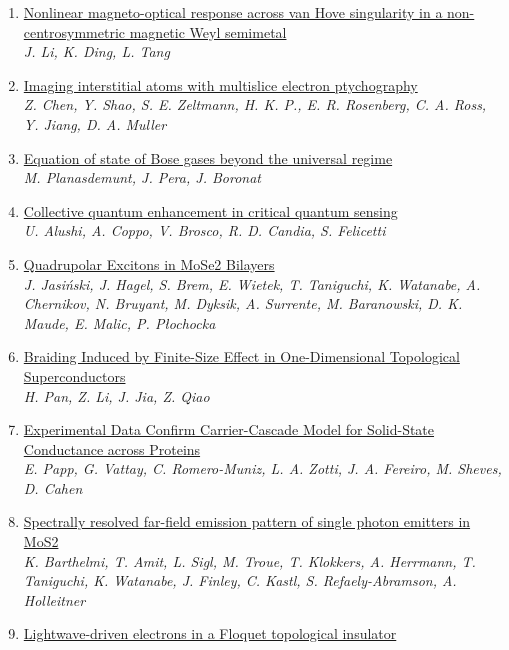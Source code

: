 \documentclass{article}
\begin{document}
\begin{enumerate}
\item\href{http://arxiv.org/abs/2407.18094v1}{\textsf{Nonlinear magneto-optical response across van Hove singularity in a
  non-centrosymmetric magnetic Weyl semimetal}}\\
{\small\color{blue}\textsl{J. Li, K. Ding, L. Tang}}
\item\href{http://arxiv.org/abs/2407.18063v1}{\textsf{Imaging interstitial atoms with multislice electron ptychography}}\\
{\small\color{blue}\textsl{Z. Chen, Y. Shao, S. E. Zeltmann, H. K. P., E. R. Rosenberg, C. A. Ross, Y. Jiang, D. A. Muller}}
\item\href{http://arxiv.org/abs/2407.18059v1}{\textsf{Equation of state of Bose gases beyond the universal regime}}\\
{\small\color{blue}\textsl{M. Planasdemunt, J. Pera, J. Boronat}}
\item\href{http://arxiv.org/abs/2407.18055v1}{\textsf{Collective quantum enhancement in critical quantum sensing}}\\
{\small\color{blue}\textsl{U. Alushi, A. Coppo, V. Brosco, R. D. Candia, S. Felicetti}}
\item\href{http://arxiv.org/abs/2407.18040v1}{\textsf{Quadrupolar Excitons in MoSe2 Bilayers}}\\
{\small\color{blue}\textsl{J. Jasiński, J. Hagel, S. Brem, E. Wietek, T. Taniguchi, K. Watanabe, A. Chernikov, N. Bruyant, M. Dyksik, A. Surrente, M. Baranowski, D. K. Maude, E. Malic, P. Płochocka}}
\item\href{http://arxiv.org/abs/2407.17988v1}{\textsf{Braiding Induced by Finite-Size Effect in One-Dimensional Topological
  Superconductors}}\\
{\small\color{blue}\textsl{H. Pan, Z. Li, J. Jia, Z. Qiao}}
\item\href{http://arxiv.org/abs/2407.17982v1}{\textsf{Experimental Data Confirm Carrier-Cascade Model for Solid-State
  Conductance across Proteins}}\\
{\small\color{blue}\textsl{E. Papp, G. Vattay, C. Romero-Muniz, L. A. Zotti, J. A. Fereiro, M. Sheves, D. Cahen}}
\item\href{http://arxiv.org/abs/2407.17968v1}{\textsf{Spectrally resolved far-field emission pattern of single photon emitters
  in MoS2}}\\
{\small\color{blue}\textsl{K. Barthelmi, T. Amit, L. Sigl, M. Troue, T. Klokkers, A. Herrmann, T. Taniguchi, K. Watanabe, J. Finley, C. Kastl, S. Refaely-Abramson, A. Holleitner}}
\item\href{http://arxiv.org/abs/2407.17917v1}{\textsf{Lightwave-driven electrons in a Floquet topological insulator}}\\

\end{enumerate}
\end{document}
